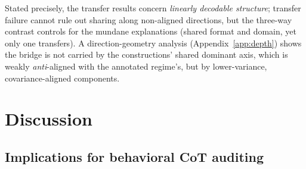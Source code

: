 \documentclass{article}
\begin{document}
Stated precisely, the transfer results concern \emph{linearly decodable structure}; transfer failure cannot rule out sharing along non-aligned directions, but the three-way contrast controls for the mundane explanations (shared format and domain, yet only one transfers). A direction-geometry analysis (Appendix~\ref{app:depth}) shows the bridge is not carried by the constructions' shared dominant axis, which is weakly \emph{anti}-aligned with the annotated regime's, but by lower-variance, covariance-aligned components.

\section{Discussion}
\label{sec:discussion}

\subsection{Implications for behavioral CoT auditing}
\end{document}
